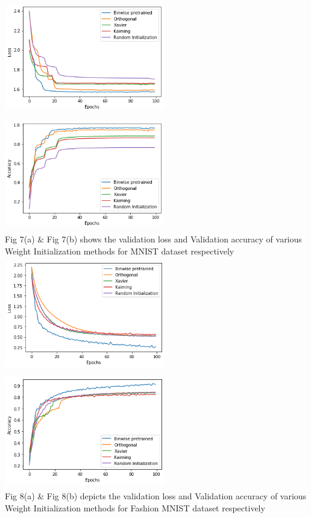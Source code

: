 \documentclass{article}
\begin{document}
\includegraphics[width= 7cm, height=5cm]{fig1.png}
\includegraphics[width= 7cm, height=5cm]{fig2.png}
\\
Fig 7(a) \& Fig 7(b) shows the validation loss and Validation accuracy of various Weight Initialization methods for MNIST dataset respectively
\\
\includegraphics[width= 7cm, height=5cm]{fig5.png}
\includegraphics[width= 7cm, height=5cm]{fig6.png}
\\
Fig 8(a) \& Fig 8(b) depicts the validation loss and Validation accuracy of various Weight Initialization methods for Fashion MNIST dataset respectively
\end{document}

